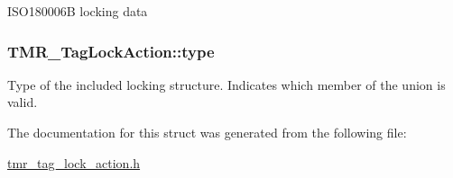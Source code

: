 ISO180006B locking data \hypertarget{struct_t_m_r___tag_lock_action_9950e948d530ebe539b9387133c0ebef}{
\subsubsection[{type}]{ {\bf TMR\_\-TagLockAction::type}}}
\label{struct_t_m_r___tag_lock_action_9950e948d530ebe539b9387133c0ebef}


Type of the included locking structure. Indicates which member of the union is valid. 

The documentation for this struct was generated from the following file:\begin{CompactItemize}
\item 
\hyperlink{tmr__tag__lock__action_8h}{tmr\_\-tag\_\-lock\_\-action.h}\end{CompactItemize}
